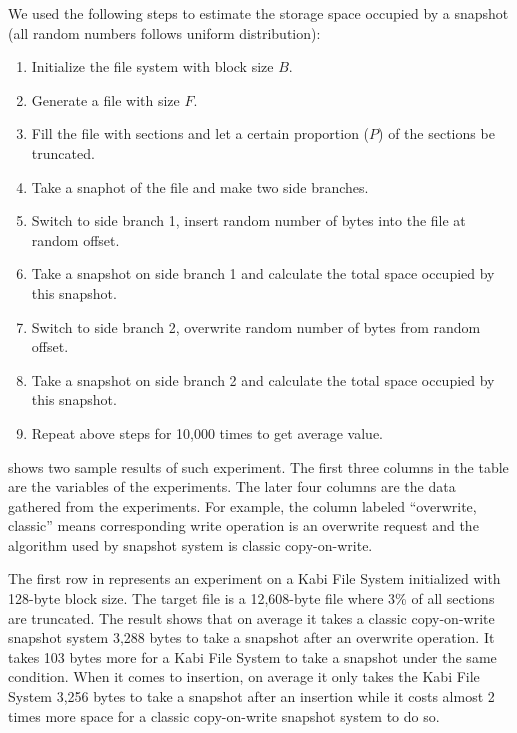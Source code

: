     We used the following steps to estimate the storage space occupied by a snapshot (all random numbers follows uniform distribution):

\begin{enumerate}

	\item Initialize the file system with block size $B$.

	\item Generate a file with size $F$.

	\item Fill the file with sections and let a certain proportion ($P$) of the sections be truncated.

	\item Take a snaphot of the file and make two side branches.
	
	\item Switch to side branch 1, insert random number of bytes into the file at random offset.

	\item Take a snapshot on side branch 1 and calculate the total space occupied by this snapshot.

	\item Switch to side branch 2, overwrite random number of bytes from random offset.

	\item Take a snapshot on side branch 2 and calculate the total space occupied by this snapshot.

	\item Repeat above steps for 10,000 times to get average value.

\end{enumerate}

     shows two sample results of such experiment. The first three columns in the table are the variables of the experiments. The later four columns are the data gathered from the experiments. For example, the column labeled ``overwrite, classic'' means corresponding write operation is an overwrite request and the algorithm used by snapshot system is classic copy-on-write.

    The first row in  represents an experiment on a Kabi File System initialized with 128-byte block size. The target file is a 12,608-byte file where 3\% of all sections are truncated. The result shows that on average it takes a classic copy-on-write snapshot system 3,288 bytes to take a snapshot after an overwrite operation. It takes 103 bytes more for a Kabi File System to take a snapshot under the same condition. When it comes to insertion, on average it only takes the Kabi File System 3,256 bytes to take a snapshot after an insertion while it costs almost 2 times more space for a classic copy-on-write snapshot system to do so.

